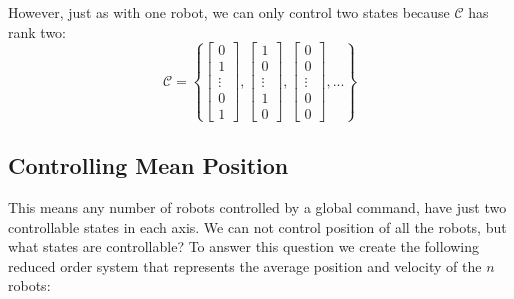  However, just as with one robot, we can only control two states because $\mathcal{C}$ has rank two:
\begin{equation}
\mathcal{C}=\left\{ \begin{bmatrix} 
0\\
1\\
\vdots\\
0\\
1
\end{bmatrix}
,
  \begin{bmatrix} 
1\\
0\\
\vdots\\
1\\
0
\end{bmatrix}
,
\begin{bmatrix} 
0\\
0\\
\vdots\\
0\\
0
\end{bmatrix}, ... \right\}
\end{equation}  
\subsection{Controlling Mean Position}\label{sec:controlMeanPosition}
This means any number of robots controlled by a global command, have just two controllable states in each axis. We can not control position of all the robots, but what states are controllable? To answer this question we create the following reduced order system that represents the average position and velocity of the $n$ robots:\\

